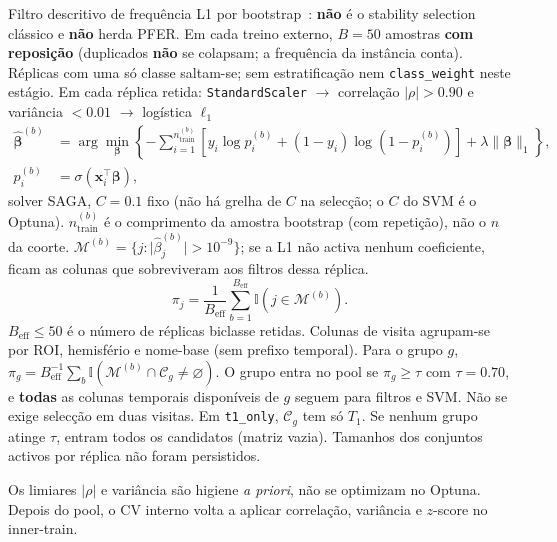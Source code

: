 \documentclass[review]{elsarticle}
\newcommand{\code}[1]{\texttt{#1}}
\begin{document}
	Filtro descritivo de frequência L1 por bootstrap~\cite{bach-2008,meinshausen-2010}: \textbf{não} é o stability selection clássico e \textbf{não} herda PFER.
	Em cada treino externo, $B=50$ amostras \textbf{com reposição} (duplicados \textbf{não} se colapsam; a frequência da instância conta).
	Réplicas com uma só classe saltam-se; sem estratificação nem \code{class\_weight} neste estágio.
	Em cada réplica retida: \code{StandardScaler} $\to$ correlação $|\rho|>0.90$ e variância $<0.01$ $\to$ logística $\ell_1$
	\begin{equation}
		\begin{aligned}
			\hat{\boldsymbol{\beta}}^{(b)}
			&= \arg\min_{\boldsymbol{\beta}}
			\left\{
			-\sum_{i=1}^{n_{\mathrm{train}}^{(b)}}
			\left[
			y_i \log p_i^{(b)} + (1-y_i)\log\!\left(1-p_i^{(b)}\right)
			\right]
			+ \lambda \|\boldsymbol{\beta}\|_1
			\right\}, \\
			p_i^{(b)} &= \sigma\!\left(\mathbf{x}_i^{\top}\boldsymbol{\beta}\right),
		\end{aligned}
		\label{eq:l1-logistic}
	\end{equation}
	solver SAGA, $C=0.1$ fixo (não há grelha de $C$ na selecção; o $C$ do SVM é o Optuna).
	$n_{\mathrm{train}}^{(b)}$ é o comprimento da amostra bootstrap (com repetição), não o $n$ da coorte.
	$\mathcal{M}^{(b)}=\{j:\lvert\hat{\beta}^{(b)}_j\rvert>10^{-9}\}$; se a L1 não activa nenhum coeficiente, ficam as colunas que sobreviveram aos filtros dessa réplica.
	\begin{equation}
		\pi_j = \frac{1}{B_{\mathrm{eff}}}\sum_{b=1}^{B_{\mathrm{eff}}} \mathbb{I}(j \in \mathcal{M}^{(b)}).
		\label{eq:stability-freq}
	\end{equation}
	$B_{\mathrm{eff}}\le 50$ é o número de réplicas biclasse retidas.
	Colunas de visita agrupam-se por ROI, hemisfério e nome-base (sem prefixo temporal).
	Para o grupo $g$, $\pi_g=B_{\mathrm{eff}}^{-1}\sum_{b}\mathbb{I}(\mathcal{M}^{(b)}\cap\mathcal{C}_g\neq\varnothing)$.
	O grupo entra no pool se $\pi_g\ge\tau$ com $\tau=0.70$, e \textbf{todas} as colunas temporais disponíveis de $g$ seguem para filtros e SVM.
	Não se exige selecção em duas visitas.
	Em \code{t1\_only}, $\mathcal{C}_g$ tem só $T_1$.
	Se nenhum grupo atinge $\tau$, entram todos os candidatos (matriz vazia).
	Tamanhos dos conjuntos activos por réplica não foram persistidos.
	
	Os limiares $|\rho|$ e variância são higiene \emph{a priori}, não se optimizam no Optuna.
	Depois do pool, o CV interno volta a aplicar correlação, variância e $z$-score no inner-train.
	
\end{document}
